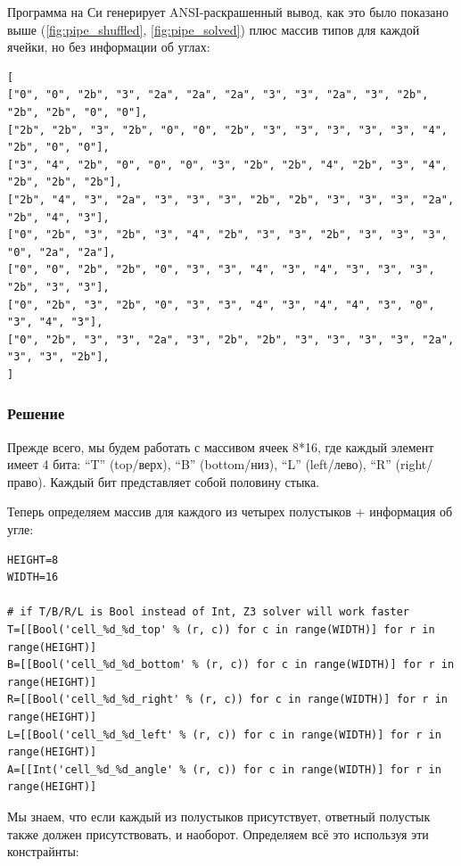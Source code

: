 Программа на Си генерирует ANSI-раскрашенный вывод, как это было показано выше
(\ref{fig:pipe_shuffled}, \ref{fig:pipe_solved}) плюс массив типов для каждой ячейки, но без информации об углах:

\begin{lstlisting}[label=init_cells]
[
["0", "0", "2b", "3", "2a", "2a", "2a", "3", "3", "2a", "3", "2b", "2b", "2b", "0", "0"],
["2b", "2b", "3", "2b", "0", "0", "2b", "3", "3", "3", "3", "3", "4", "2b", "0", "0"],
["3", "4", "2b", "0", "0", "0", "3", "2b", "2b", "4", "2b", "3", "4", "2b", "2b", "2b"],
["2b", "4", "3", "2a", "3", "3", "3", "2b", "2b", "3", "3", "3", "2a", "2b", "4", "3"],
["0", "2b", "3", "2b", "3", "4", "2b", "3", "3", "2b", "3", "3", "3", "0", "2a", "2a"],
["0", "0", "2b", "2b", "0", "3", "3", "4", "3", "4", "3", "3", "3", "2b", "3", "3"],
["0", "2b", "3", "2b", "0", "3", "3", "4", "3", "4", "4", "3", "0", "3", "4", "3"],
["0", "2b", "3", "3", "2a", "3", "2b", "2b", "3", "3", "3", "3", "2a", "3", "3", "2b"],
]
\end{lstlisting}

\subsubsection{Решение}

Прежде всего, мы будем работать с массивом ячеек 8*16, где каждый элемент имеет 4 бита:
``T'' (top/верх),
``B'' (bottom/низ),
``L'' (left/лево),
``R'' (right/право).
Каждый бит представляет собой половину стыка.



Теперь определяем массив для каждого из четырех полустыков + информация об угле:

\begin{lstlisting}
HEIGHT=8
WIDTH=16

# if T/B/R/L is Bool instead of Int, Z3 solver will work faster
T=[[Bool('cell_%d_%d_top' % (r, c)) for c in range(WIDTH)] for r in range(HEIGHT)]
B=[[Bool('cell_%d_%d_bottom' % (r, c)) for c in range(WIDTH)] for r in range(HEIGHT)]
R=[[Bool('cell_%d_%d_right' % (r, c)) for c in range(WIDTH)] for r in range(HEIGHT)]
L=[[Bool('cell_%d_%d_left' % (r, c)) for c in range(WIDTH)] for r in range(HEIGHT)]
A=[[Int('cell_%d_%d_angle' % (r, c)) for c in range(WIDTH)] for r in range(HEIGHT)]
\end{lstlisting}

Мы знаем, что если каждый из полустыков присутствует, ответный полустык также должен присутствовать, и наоборот. 
Определяем всё это используя эти констрайнты:

